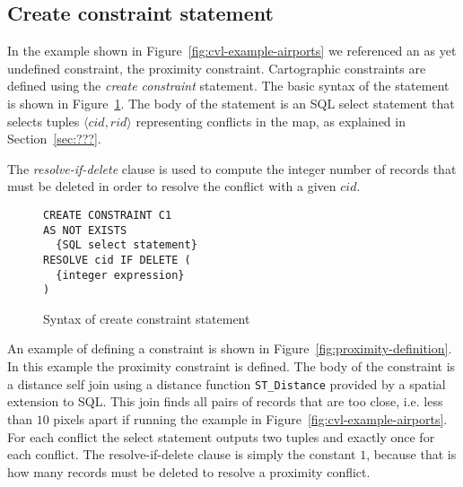 


\subsection{Create constraint statement}
\label{sec:create-constraint-statement}

In the example shown in Figure~\ref{fig:cvl-example-airports} we referenced an as yet undefined constraint, the proximity constraint. Cartographic constraints are defined using the \emph{create constraint} statement.  The basic syntax of the statement is shown in Figure~\ref{fig:create-constraint-syntax}. The body of the statement is an SQL select statement that selects tuples $\langle cid, rid\rangle$ representing conflicts in the map, as explained in Section~\ref{sec:???}.

The \emph{resolve-if-delete} clause is used to compute the integer number of records that must be deleted in order to resolve the conflict with a given $cid$.

\begin{figure}[htbp]
\begin{center}
\begin{lstlisting}
CREATE CONSTRAINT C1
AS NOT EXISTS
  {SQL select statement}
RESOLVE cid IF DELETE (
  {integer expression}
)
\end{lstlisting}
\caption{Syntax of create constraint statement}
\label{fig:create-constraint-syntax}
\end{center}
\end{figure}

An example of defining a constraint is shown in Figure~\ref{fig:proximity-definition}. In this example the proximity constraint is defined. The body of the constraint is a distance self join using a distance function \texttt{ST\_Distance} provided by a spatial extension to SQL. This join finds all pairs of records that are too close, i.e. less than $10$ pixels apart if running the example in Figure~\ref{fig:cvl-example-airports}. For each conflict the select statement outputs two tuples and exactly once for each conflict. The resolve-if-delete clause is simply the constant $1$, because that is how many records must be deleted to resolve a proximity conflict.

